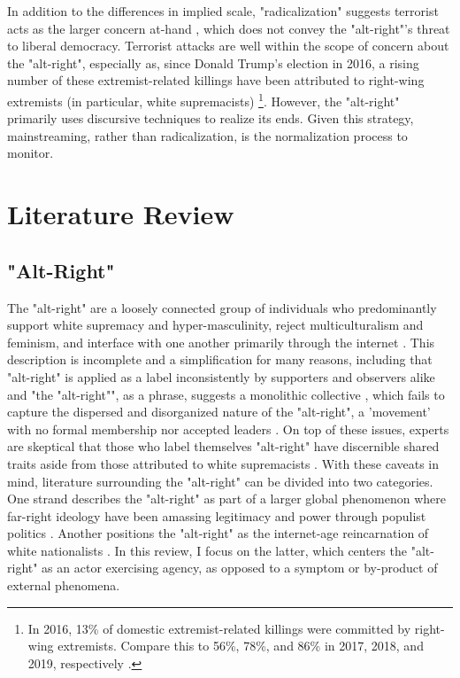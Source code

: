 \documentclass[acmlarge, screen, authorversion]{acmart}
\begin{document}
In addition to the differences in implied scale, "radicalization" suggests terrorist acts as the larger concern at-hand \cite{torokDevelopingExplanatoryModel2013}, which does not convey the "alt-right"'s threat to liberal democracy. Terrorist attacks are well within the scope of concern about the "alt-right", especially as, since Donald
Trump’s election in 2016, a rising number of these extremist-related
killings have been attributed to right-wing extremists (in particular,
white supremacists) \cite{greenblattRightWingExtremistViolence}
\footnote{In 2016, 13\% of domestic extremist-related killings were committed by right-wing extremists. Compare this to 56\%, 78\%, and 86\% in 2017, 2018, and 2019, respectively \cite{greenblattRightWingExtremistViolence}.}. 
However, the "alt-right" primarily uses discursive techniques to realize its ends. Given this strategy, mainstreaming, rather than radicalization, is the normalization process to monitor.

\section{Literature Review}

\subsection{"Alt-Right"}

The "alt-right" are a loosely connected group of individuals who predominantly support white supremacy and hyper-masculinity, reject multiculturalism and feminism, and interface with one another primarily through the internet
\cite{sternProudBoysWhite2019, mainRiseAltRight2018, nagleKillAllNormies2017, hawleyMakingSenseAltright2017}.
This description is incomplete and a simplification for
many reasons, including that "alt-right" is applied as a label inconsistently
by supporters and observers alike \cite{hawleyMakingSenseAltright2017} and
"the "alt-right"", as a phrase, suggests a monolithic collective
\cite{massanariRethinkingResearchEthics2018}, which fails to capture the
dispersed and disorganized \cite{martinDissectingTrumpMost2017} nature of the
"alt-right", a 'movement' with no formal membership nor accepted leaders
\cite{hawleyMakingSenseAltright2017}. On top of these issues, experts are
skeptical that those who label themselves "alt-right" have discernible shared
traits aside from those attributed to white supremacists
\cite{gallaherMainstreamingWhiteSupremacy2020,
johndaniszewskiWritingAltright2016}.  With these caveats in mind, literature
surrounding the "alt-right" can be divided into two categories. One strand
describes the "alt-right" as part
of a larger global phenomenon where far-right ideology have been
amassing legitimacy and power through populist politics
\cite{cammaertsMainstreamingExtremeRightWing2018,
worthMorbidSymptomsGlobal2019}. Another positions the
"alt-right" as the internet-age reincarnation of white nationalists
\cite{hawleyMakingSenseAltright2017, mainRiseAltRight2018}. In this review,
I focus on the latter, which centers the "alt-right" as an actor exercising agency, as opposed to a symptom or by-product of external phenomena.
\end{document}
